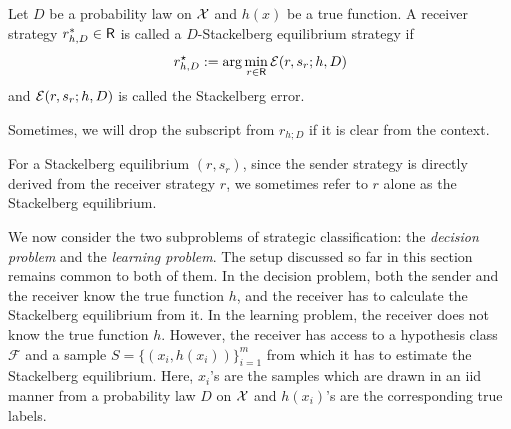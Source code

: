 \begin{defn}\label{def:Stackelberg equilibrium}
	Let $D$ be a probability law on $\mathcal{X}$ and $h(x)$ be a true function. A receiver strategy $r^*_{h,D} \in \mathsf{R}$ is called a $D$-Stackelberg equilibrium strategy if
	\begin{equation*}
		r^{\star}_{h,D} := \arg\min_{r \in \mathsf{R}}\mathcal{E}(r,s_r;h,D)
	\end{equation*}
and $\mathcal{E}(r,s_r;h,D)$ is called the Stackelberg error.
\end{defn}
\begin{notn}
	Sometimes, we will drop the subscript from $r_{h;D}$ if it is clear from the context.
\end{notn}
\begin{notn}
For a Stackelberg equilibrium $(r,s_r)$, since the sender strategy is directly derived from the receiver strategy $r$, we sometimes refer to $r$ alone as the Stackelberg equilibrium.
\end{notn}

We now consider the two subproblems of strategic classification: the \textit{decision problem} and the \textit{learning problem}. The setup discussed so far in this section remains common to both of them. In the decision problem, both the sender and the receiver know the true function $h$, and the receiver has to calculate the Stackelberg equilibrium from it. In the learning problem, the receiver does not know the true function $h$. However, the receiver has access to a hypothesis class $\mathcal{F}$ and a sample $S = \{(x_i, h(x_i))\}_{i=1}^m$ from which it has to estimate the Stackelberg equilibrium. Here, $x_i$'s are the samples which are drawn in an iid manner from a probability law  $D$ on $\mathcal{X}$ and $h(x_i)$'s are the corresponding true labels.



